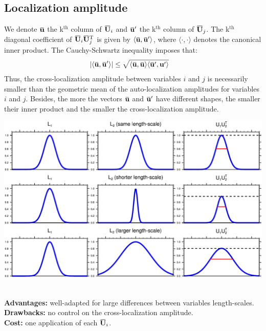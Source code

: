 \documentclass[12pt]{scrartcl}
\newcommand{\overbar}[1]{\mkern 1.5mu\overline{\mkern-1.5mu#1\mkern-1.5mu}\mkern 1.5mu}
\begin{document}
\subsection{Localization amplitude}
We denote $\overbar{\mathbf{u}}$ the k$^\textrm{th}$ column of $\overbar{\mathbf{U}}_i$ and $\overbar{\mathbf{u}}'$ the k$^\textrm{th}$ column of $\overbar{\mathbf{U}}_j$. The k$^\textrm{th}$ diagonal coefficient of $\overbar{\mathbf{U}}_i \overbar{\mathbf{U}}_j^\mathrm{T}$ is given by $\langle \overbar{\mathbf{u}},\overbar{\mathbf{u}}' \rangle$, where $\langle \cdot, \cdot \rangle$ denotes the canonical inner product. The Cauchy-Schwartz inequality imposes that:
\begin{align}
\vert \langle \overbar{\mathbf{u}},\overbar{\mathbf{u}}' \rangle \vert & \le \sqrt{\langle \overbar{\mathbf{u}},\overbar{\mathbf{u}} \rangle \langle \overbar{\mathbf{u}}',\mathbf{u}' \rangle}
\end{align}
Thus, the cross-localization amplitude between variables $i$ and $j$ is necessarily smaller than the geometric mean of the auto-localization amplitudes for variables $i$ and $j$. Besides, the more the vectors $\overbar{\mathbf{u}}$ and $\overbar{\mathbf{u}}'$ have different shapes, the smaller their inner product and the smaller the cross-localization amplitude.
\begin{center}
\includegraphics[width=\linewidth]{convolution_exp.pdf}
\end{center}
$  $\\
\textbf{Advantages:} well-adapted for large differences between variables length-scales.\\
\textbf{Drawbacks:} no control on the cross-localization amplitude.\\
\textbf{Cost:} one application of each $\overbar{\mathbf{U}}_i$.
\end{document}
